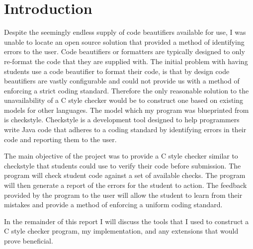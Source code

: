 

\chapter{Introduction}
\label{chap:INTRO}

Despite the seemingly endless supply of code beautifiers available for use, 
I was unable to locate an open source solution that provided a method of 
identifying errors to the user. Code beautifiers or formatters are typically 
designed to only re-format the code that they are supplied with. The initial 
problem with having students use a code beautifier to format their code, is 
that by design code beautifiers are vastly configurable and could not provide 
us with a method of enforcing a strict coding standard. Therefore the only 
reasonable solution to the unavailability of a C style checker would be to 
construct one based on existing models for other languages. The model which my 
program was blueprinted from is checkstyle. Checkstyle is a development tool 
designed to help programmers write Java code that adheres to a coding standard 
by identifying errors in their code and reporting them to the user.

The main objective of the project was to provide a C style checker similar to 
checkstyle that students could use to verify their code before submission. 
The program will check student code against a set of available checks. 
The program will then generate a report of the errors for the student to 
action. The feedback provided by the program to the user will allow the student
to learn from their mistakes and provide a method of enforcing a uniform coding
standard.

In the remainder of this report I will discuss the tools that I used to 
construct a C style checker program, my implementation, and any extensions 
that would prove beneficial.

